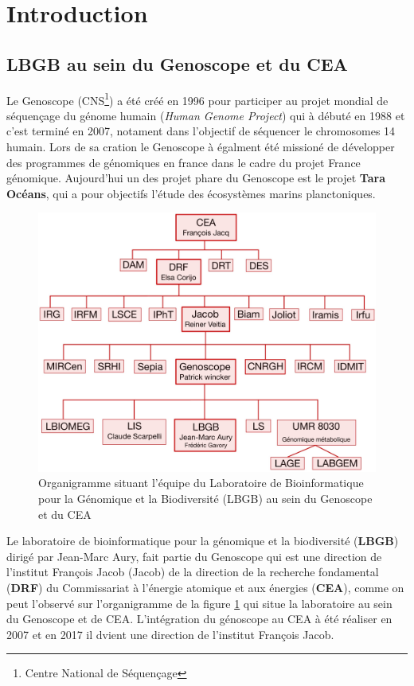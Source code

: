 \section{Introduction}
\subsection{LBGB au sein du Genoscope et du CEA}
Le Genoscope (CNS\footnote{Centre National de Séquençage}) a été créé en 1996 pour participer au projet mondial de séquençage du génome humain (\emph{Human Genome Project}) qui à débuté en 1988 et c'est terminé en 2007, notament dans l'objectif de séquencer le chromosomes 14 humain. Lors de sa cration le Genoscope à égalment été missioné de développer des programmes de génomiques en france dans le cadre du projet France génomique.  Aujourd'hui un des projet phare du Genoscope est le projet \textbf{Tara Océans}, qui  a pour objectifs l'étude des écosystèmes marins planctoniques.

\begin{minipage}{0.40\textwidth}
\begin{figure}[H]
    \centering
    \includegraphics[width=1\textwidth]{img/organigramme.jpg}
    \caption{Organigramme situant l’équipe du Laboratoire de Bioinformatique pour la Génomique et la Biodiversité (LBGB) au sein du Genoscope et du CEA}
    \label{organigramme_LBGB}
\end{figure}
\end{minipage} 
\hfill
\begin{minipage}{0.5\textwidth}
    Le laboratoire de bioinformatique pour la génomique et la biodiversité (\textbf{LBGB}) dirigé par Jean-Marc Aury, fait partie du Genoscope qui est une direction de l'institut François Jacob (Jacob) de la direction de la recherche fondamental (\textbf{DRF}) du Commissariat à l'énergie atomique et aux énergies (\textbf{CEA}), comme on peut l'observé sur l'organigramme de la figure \ref{organigramme_LBGB} qui situe la laboratoire au sein du Genoscope et de CEA. L'intégration du génoscope au CEA à été réaliser en 2007 et en 2017 il dvient une direction de l'institut François Jacob.
\end{minipage}

